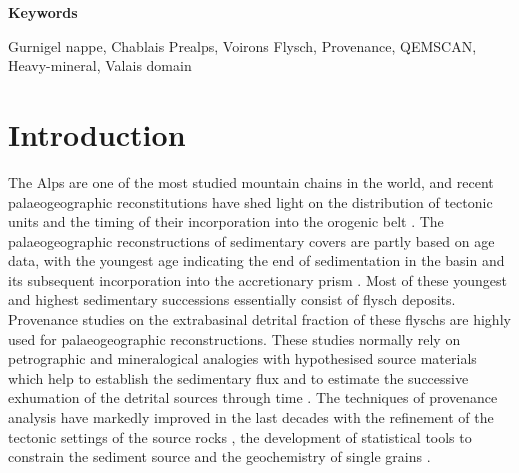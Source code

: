 \documentclass[twoside]{article}
\newcommand\registred{\textsuperscript{\tiny\textregistered}}
\begin{document}
\begin{center}
{\small{\bf Keywords}\par
\smallskip
Gurnigel nappe, Chablais Prealps, Voirons Flysch, Provenance, QEMSCAN\registred, Heavy-mineral, Valais domain\par}
\end{center}

\section{Introduction}

The Alps are one of the most studied mountain chains in the world, and recent palaeogeographic reconstitutions have shed light on the distribution of tectonic units and the timing of their incorporation into the orogenic belt \citep{Schmid1996,Schmid2004,Stampfli2002a,Stampfli2002b,Handy2010}. The palaeogeographic reconstructions of sedimentary covers are partly based on age data, with the youngest age indicating the end of sedimentation in the basin and its subsequent incorporation into the accretionary prism \citep{Stampfli2002b}. Most of these youngest and highest sedimentary successions essentially consist of flysch deposits. Provenance studies on the extrabasinal detrital fraction of these flyschs are highly used for palaeogeographic reconstructions. These studies normally rely on petrographic and mineralogical analogies with hypothesised source materials \citep{Eynatten1999,Beltran-Trivino2013} which help to establish the sedimentary flux and to estimate the successive exhumation of the detrital sources through time \citep{Trautwein2001a}. The techniques of provenance analysis have markedly improved in the last decades with the refinement of the tectonic settings of the source rocks \citep{Dickinson1979a,Dickinson1983,Dickinson1985}, the development of statistical tools to constrain the sediment source \citep{Garzanti2004,Garzanti2007a,Garzanti2007b,Garzanti2010} and the geochemistry of single grains \citep{Eynatten2012}.\par
\medskip

\end{document}
